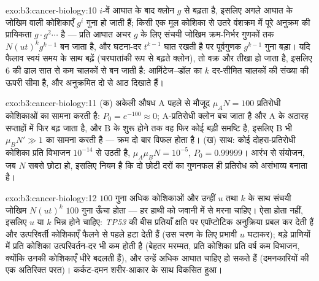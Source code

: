 \begin{solution}{exo:b3:cancer-biology:10}
$i$-वें आघात के बाद क्लोन $g$ से बढ़ता है, इसलिए अगले आघात के जोखिम
वाली कोशिकाएँ $g^{i}$ गुना हो जाती हैं; किसी एक मूल कोशिका से उतरे
वंशक्रम में पूरे अनुक्रम की प्रायिकता $g\cdot g^{2}\cdots$ है
--- प्रति आघात अचर $g$ के लिए संचयी जोखिम क्रम-निर्भर गुणकों तक
$N(ut)^{k}
g^{k-1}$ बन जाता है, और घटना-दर $t^{k-1}$ घात रखती है पर पूर्वगुणक
$g^{k-1}$ गुना बड़ा। यदि फैलाव स्वयं समय के साथ बढ़ें (चरघातांकी रूप से
बढ़ते क्लोन), तो वक्र और तीखा हो जाता है, इसलिए $6$ की ढाल सात से कम
चालकों से बन जाती है: आर्मिटेज--डॉल का $k$ दर-सीमित चालकों की संख्या की
ऊपरी सीमा है, और अनुक्रमित  दो से आठ दिखाते हैं।
\end{solution}

\begin{solution}{exo:b3:cancer-biology:11}
(क) अकेली औषध A पहले से मौजूद $\mu_{A}N = 100$ प्रतिरोधी कोशिकाओं का
सामना करती है: $P_{0} = e^{-100} \approx 0$; A-प्रतिरोधी क्लोन बच जाता
है और A के अठारह सप्ताहों में फिर बढ़ जाता है, और B के शुरू होने तक वह
फिर कोई बड़ी समष्टि है, इसलिए B भी $\mu_{B}N' \gg 1$ का सामना करती है
--- क्रम दो बार विफल होता है। (ख) साथ: कोई दोहरा-प्रतिरोधी कोशिका प्रति
विभाजन $10^{-14}$ से उठती है, $\mu_{A}\mu_{B}N = 10^{-5}$, $P_{0} =
0.99999$। आरंभ से संयोजन, जब $N$ सबसे छोटा हो, इसलिए नियम है कि दो
छोटी दरों का गुणनफल ही प्रतिरोध को असंभाव्य बनाता है।
\end{solution}

\begin{solution}{exo:b3:cancer-biology:12}
$100$ गुना अधिक कोशिकाओं और उन्हीं $u$ तथा $k$ के साथ संचयी जोखिम
$N(ut)^{k}$ $100$ गुना ऊँचा होता --- हर हाथी को जवानी में  से मरना
चाहिए। ऐसा होता नहीं, इसलिए $u$ या $k$ भिन्न होने चाहिए:
\emph{TP53} की बीस प्रतियाँ क्षति पर एपॉप्टोटिक अनुक्रिया प्रबल कर
देती हैं और उत्परिवर्ती कोशिकाएँ फैलने से पहले हटा देती हैं (उस चरण के
लिए प्रभावी $u$ घटाकर); बड़े प्राणियों में प्रति कोशिका उत्परिवर्तन-दर
भी कम होती है (बेहतर मरम्मत, प्रति कोशिका प्रति वर्ष कम विभाजन,
क्योंकि उनकी कोशिकाएँ धीरे बदलती हैं), और उन्हें अधिक आघात चाहिए हो
सकते हैं (दमनकारियों की एक अतिरिक्त परत)। कर्कट-दमन शरीर-आकार के साथ
विकसित हुआ।
\end{solution}


